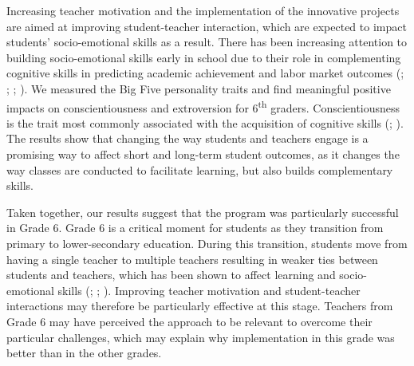 \documentclass[11pt,a4paper]{article}
\begin{document}
Increasing teacher motivation and the implementation of the innovative projects are aimed at improving student-teacher interaction, which are expected to impact students' socio-emotional skills as a result. There has been increasing attention to building socio-emotional skills early in school due to their role in complementing cognitive skills in predicting academic achievement and labor market outcomes (\citealp{heckman2001importance}; \citealp{heckman2006effects}; \citealp{lindqvist2011labor}; \citealp{segal2013misbehavior}). We measured the Big Five personality traits and find meaningful positive impacts on conscientiousness and extroversion for 6\textsuperscript{th} graders. Conscientiousness is the trait most commonly associated with the acquisition of cognitive skills (\citealp{poropat2009meta}; \citealp{ivcevic2014predicting}). The results show that changing the way students and teachers engage is a promising way to affect short and long-term student outcomes, as it changes the way classes are conducted to facilitate learning, but also builds complementary skills. 

Taken together, our results suggest that the program was particularly successful in Grade 6. Grade 6 is a critical moment for students as they transition from primary to lower-secondary education. During this transition, students move from having a single teacher to multiple teachers resulting in weaker ties between students and teachers, which has been shown to affect learning and socio-emotional skills (\citealp{bedard2005middle}; \citealp{hanewald2013transition}; \citealp{Santos2017}). Improving teacher motivation and student-teacher interactions may therefore be particularly effective at this stage. Teachers from Grade 6 may have perceived the approach to be relevant to overcome their particular challenges, which may explain why implementation in this grade was better than in the other grades. 
\end{document}
